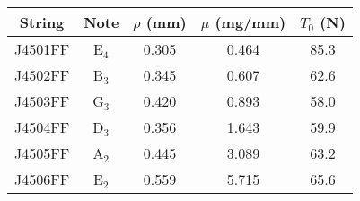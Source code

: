 \begin{tabular}{ccccc}
\toprule
String & Note & $\rho$ (mm) & $\mu$ (mg/mm) & $T_0$ (N) \\
\midrule
J4501FF & E$_{4}$ & 0.305 & 0.464 & 85.3 \\
J4502FF & B$_{3}$ & 0.345 & 0.607 & 62.6 \\
J4503FF & G$_{3}$ & 0.420 & 0.893 & 58.0 \\
J4504FF & D$_{3}$ & 0.356 & 1.643 & 59.9 \\
J4505FF & A$_{2}$ & 0.445 & 3.089 & 63.2 \\
J4506FF & E$_{2}$ & 0.559 & 5.715 & 65.6 \\
\bottomrule
\end{tabular}

